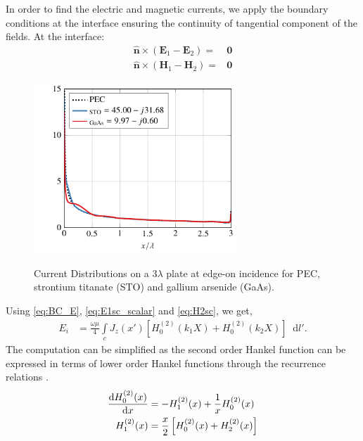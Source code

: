 \documentclass{ieeeaccess}
\renewcommand{\v}[1]{\mathbf{#1}} %
\renewcommand{\O}{\omega}  %
\renewcommand{\u}{\mu}  %
\newcommand{\x}{\times}  %
\renewcommand{\^}{\hat}  %
\newcommand*\diff{\mathop{}\!\mathrm{d}} %
\begin{document}
% 
In order to find the electric and magnetic currents, we apply the boundary conditions at the interface ensuring the continuity of tangential component of the fields. At the interface:
%
\begin{subequations}
  \begin{align}
    \^{\v n} \x (\v E_1 - \v E_2) ={}& \v 0
    \label{eq:BC_E}\\
    \^{\v n} \x (\v H_1 - \v H_2) ={}& \v 0
    \label{eq:BC_H}
  \end{align}
  \label{eq:BC}%
\end{subequations}%
%
\begin{figure}[!t]
  \centering
  {\includegraphics[width=3in]{current_edgeon_3.pdf}
      }
  \caption{Current Distributions on a $3\lambda$ plate at edge-on incidence for PEC, strontium titanate (STO) and gallium arsenide (GaAs).}
  \label{fig:edgeon}
\end{figure}
% 
Using \eqref{eq:BC_E}, \eqref{eq:E1sc_scalar} and \eqref{eq:H2sc}, we get,
%
\begin{align}
  E_i &= \frac{\O \u}{4} \int\limits_c J_z(x') \left[ H_0^{(2)}(k_1 X) + H_0^{(2)}(k_2 X)\right] \diff{l'}.
  \label{eq:scalarE}
\end{align}
The computation can be simplified as the second order Hankel function can be expressed in terms of lower order Hankel functions through the recurrence relations \cite[p. 361]{Abramowitz2012}.
%
\begin{subequations}
  \begin{align}
    \dv{H_0^{(2)}(x)}{x} &= -H_{1}^{(2)}(x) + \frac{1}{x} H_0^{(2)}(x)
    \label{eq:Hankel_ID1}\\
    H_{1}^{(2)}(x)  &= \frac{x}{2} \left[H_{0}^{(2)}(x) + H_{2}^{(2)}(x)\right]
    \label{eq:Hankel_ID2}
  \end{align}
  \label{eq:Hankel_ID}%
\end{subequations}%
%
\end{document}
